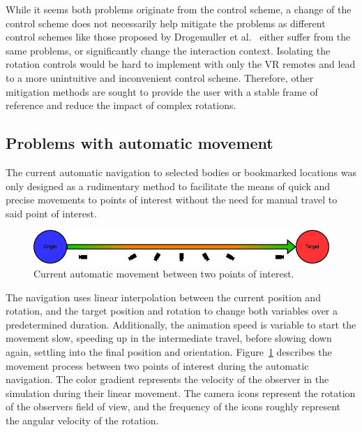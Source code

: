 While it seems both problems originate from the control scheme, a change of the control scheme does not necessarily
help mitigate the problems as different control schemes like those proposed by Drogemuller et al.~\cite{Drogemuller2020}
either suffer from the same problems, or significantly change the interaction context.
Isolating the rotation controls would be hard to implement with only the VR remotes and lead to a more unintuitive
and inconvenient control scheme.
Therefore, other mitigation methods are sought to provide the user with a stable frame of reference and reduce the
impact of complex rotations.


\subsection{Problems with automatic movement}\label{subsec:problems-with-automatic-movement}

The current automatic navigation to selected bodies or bookmarked locations was only designed as a rudimentary method
to facilitate the means of quick and precise movements to points of interest without the need for manual travel to
said point of interest.

\begin{figure}[h]
    \centering
    \includegraphics[width=\textwidth]{content/3_current_state/img/OldAutomaticNavigation}
    \caption{Current automatic movement between two points of interest.}
    \label{fig:old-auto-nav}
\end{figure}

The navigation uses linear interpolation between the current position and rotation, and the target position and
rotation to change both variables over a predetermined duration.
Additionally, the animation speed is variable to start the movement slow, speeding up in the intermediate travel,
before slowing down again, settling into the final position and orientation.
Figure~\ref{fig:old-auto-nav} describes the movement process between two points of interest during the automatic
navigation.
The color gradient represents the velocity of the observer in the simulation during their linear movement.
The camera icons represent the rotation of the observers field of view, and the frequency of the icons roughly
represent the angular velocity of the rotation.

